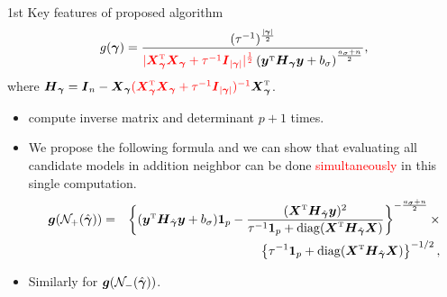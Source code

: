 \documentclass[citecolor=blue,10pt]{beamer}
\def\bg{{\boldsymbol \gamma}}
\def\T{{ \mathrm{\scriptscriptstyle T} }}
\newcommand{\0} {\mbox{\boldmath$0$}}
\def\1{{\boldsymbol 1}}
\def\diag{{\rm diag}}
\newcommand{\uH} {{\boldsymbol H}}
\newcommand{\uy}{{\boldsymbol y}}
\newcommand{\uX}{{\boldsymbol X}}
\newcommand{\ug} {\mbox{\boldmath$g$}}
\newcommand{\uI} {\mbox{\boldmath$I$}}
\begin{document}
\begin{frame}{1st Key features of proposed algorithm}
\begin{eqnarray*}
g(\bg)=\frac{(\tau^{-1})^{\frac{|\bg|}{2}}}{{\color{red}{|\uX_{\bg}^{\T}
 \uX_{\bg}+\tau^{-1}\uI_{|\bg|} |^{\frac{1}{2}}}}  \left(\uy^{\T}\uH_{\bg}
 \uy+b_{\sigma}\right)^{\frac{a_{\sigma}+n}{2}}},
\end{eqnarray*}
where $\uH_{\bg} = \uI_n-\uX_{\bg}{\color{red}{(\uX_{\bg}^{\T}\uX_{\bg}+\tau^{-1}\uI_{|\bg|})^{-1}}}\uX_{\bg}^{\T}$.
\begin{itemize}
\item compute inverse matrix and determinant $p+1$ times. 
\item We propose the following formula and we can show that evaluating all candidate models in addition neighbor can be done \textcolor{red}{simultaneously} in this single computation. 
\begin{eqnarray}
\nonumber \ug({\mathcal{N}_+({\hat\bg})})&=& \left\{(\uy^{\T}\uH_{\hat{\bg}}\uy+b_{\sigma}) \1_p-\frac{(\uX^{\T}\uH_{\hat{\bg}}\uy)^2}{\tau^{-1}\1_p+\diag(\uX^{\T}\uH_{\hat{\bg}}\uX) } \right\}^
 {-\frac{a_{\sigma}+n}{2}}\times\\
 &&\left\{\tau^{-1} \1_p  +\diag(\uX^{\T}\uH_{\hat{\bg}}\uX) \right\}^{-1/2},
 \end{eqnarray}
 \item Similarly for $\ug({\mathcal{N}_-({\hat\bg})})$.
\end{itemize}
\end{frame}
\end{document}
